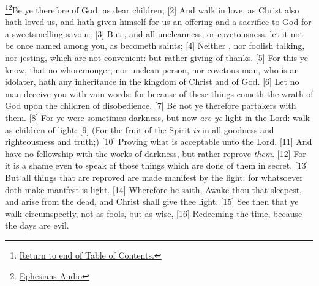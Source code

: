 \footnote{\textcolor[cmyk]{0.99998,1,0,0}{\hyperlink{TOC}{Return to end of Table of Contents.}}}\footnote{\href{https://www.audioverse.org/english/audiobibles/books/ENGKJV/N/Eph/1}{\textcolor[cmyk]{0.99998,1,0,0}{Ephesians Audio}}}\textcolor[cmyk]{0.99998,1,0,0}{Be ye therefore  of God, as dear children;}
[2] \textcolor[cmyk]{0.99998,1,0,0}{And walk in love, as Christ also hath loved us, and hath given himself for us an offering and a sacrifice to God for a sweetsmelling savour.}
[3] \textcolor[cmyk]{0.99998,1,0,0}{But , and all uncleanness, or covetousness, let it not be once named among you, as becometh saints;}
[4] \textcolor[cmyk]{0.99998,1,0,0}{Neither , nor foolish talking, nor jesting, which are not convenient: but rather giving of thanks.}
[5] \textcolor[cmyk]{0.99998,1,0,0}{For this ye know, that no whoremonger, nor unclean person, nor covetous man, who is an idolater, hath any inheritance in the kingdom of Christ and of God.}
[6] \textcolor[cmyk]{0.99998,1,0,0}{Let no man deceive you with vain words: for because of these things cometh the wrath of God upon the children of disobedience.}
[7] \textcolor[cmyk]{0.99998,1,0,0}{Be not ye therefore partakers with them.}
[8] \textcolor[cmyk]{0.99998,1,0,0}{For ye were sometimes darkness, but now \emph{are} \emph{ye} light in the Lord: walk as children of light:}
[9] \textcolor[cmyk]{0.99998,1,0,0}{(For the fruit of the Spirit \emph{is} in all goodness and righteousness and truth;)}
[10] \textcolor[cmyk]{0.99998,1,0,0}{Proving what is acceptable unto the Lord.}
[11] \textcolor[cmyk]{0.99998,1,0,0}{And have no fellowship with the  works of darkness, but rather reprove \emph{them}.}
[12] \textcolor[cmyk]{0.99998,1,0,0}{For it is a shame even to speak of those things which are done of them in secret.}
[13] \textcolor[cmyk]{0.99998,1,0,0}{But all things that are reproved are made manifest by the light: for whatsoever doth make manifest is light.}
[14] \textcolor[cmyk]{0.99998,1,0,0}{Wherefore he saith, Awake thou that sleepest, and arise from the dead, and Christ shall give thee light.}
[15] \textcolor[cmyk]{0.99998,1,0,0}{See then that ye walk circumspectly, not as fools, but as wise,}
[16] \textcolor[cmyk]{0.99998,1,0,0}{Redeeming the time, because the days are evil.}
